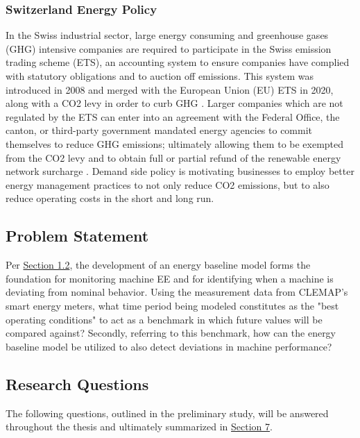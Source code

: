 \subsubsection{Switzerland Energy Policy}
In the Swiss industrial sector, large energy consuming and greenhouse gases (GHG) intensive companies are required to participate in the Swiss emission trading scheme (ETS), an accounting system to ensure companies have complied with statutory obligations and to auction off emissions. This system was introduced in 2008 and merged with the European Union (EU) ETS in 2020, along with a CO2 levy in order to curb GHG \cite{carbon_trading}. Larger companies which are not regulated by the ETS can enter into an agreement with the Federal Office, the canton, or third-party government mandated energy agencies to commit themselves to reduce GHG emissions; ultimately allowing them to be exempted from the CO2 levy and to obtain full or partial refund of the renewable energy network surcharge \cite{optional}. Demand side policy is motivating businesses to employ better energy management practices to not only reduce CO2 emissions, but to also reduce operating costs in the short and long run. 

\subsection{Problem Statement}

Per \hyperlink{subsection.1.2}{Section 1.2}, the development of an energy baseline model forms the foundation for monitoring machine EE and for identifying when a machine is deviating from nominal behavior. Using the measurement data from CLEMAP's smart energy meters, what time period being modeled constitutes as the "best operating conditions" to act as a benchmark in which future values will be compared against? Secondly, referring to this benchmark, how can the energy baseline model be utilized to also detect deviations in machine performance?

\subsection{Research Questions}

The following questions, outlined in the preliminary study, will be answered throughout the thesis and ultimately summarized in \hyperlink{section.7}{Section 7}. 

